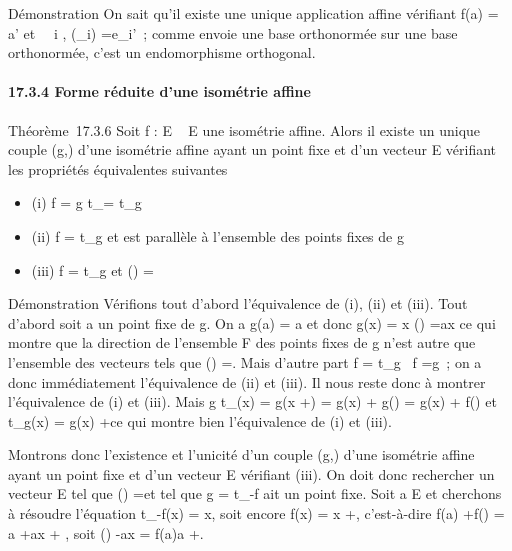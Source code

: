 \documentclass[]{article}
\begin{document}
Démonstration On sait qu'il existe une unique application affine
vérifiant f(a) = a' et \forall~~i \in [1,n],
\vecf(\vece_i)
=\vec e_i'~; comme \vecf
envoie une base orthonormée sur une base orthonormée, c'est un
endomorphisme orthogonal.

\paragraph{17.3.4 Forme réduite d'une isométrie affine}

Théorème~17.3.6 Soit f : E \rightarrow~ E une isométrie affine. Alors il existe un
unique couple (g,\overrightarrow\xi) d'une isométrie
affine ayant un point fixe et d'un vecteur
\overrightarrow\xi \in\overrightarrow
E vérifiant les propriétés équivalentes suivantes

\begin{itemize}
\itemsep1pt\parskip0pt
\item
  (i) f = g \cdot t_\overrightarrow\xi =
  t_\overrightarrow\xi \cdot g
\item
  (ii) f = t_\overrightarrow\xi \cdot g et
  \overrightarrow\xi est parallèle à l'ensemble des
  points fixes de g
\item
  (iii) f = t_\overrightarrow\xi \cdot g et
  \vecf(\overrightarrow\xi)
  =\overrightarrow \xi
\end{itemize}

Démonstration Vérifions tout d'abord l'équivalence de (i), (ii) et
(iii). Tout d'abord soit a un point fixe de g. On a g(a) = a et donc
g(x) = x \Leftrightarrow
\vecg(\overrightarrowax)
=\overrightarrow ax ce qui montre que la direction
\overrightarrowF de l'ensemble F des points fixes de
g n'est autre que l'ensemble des vecteurs
\overrightarrow\xi tels que
\vecg(\overrightarrow\xi)
=\overrightarrow \xi. Mais d'autre part f =
t_\overrightarrow\xi \cdot g
\rigtharrow~\vec f =\vec g~; on a donc
immédiatement l'équivalence de (ii) et (iii). Il nous reste donc à
montrer l'équivalence de (i) et (iii). Mais g \cdot
t_\overrightarrow\xi(x) = g(x
+\overrightarrow \xi) = g(x) +\vec
g(\overrightarrow\xi) = g(x) +\vec
f(\overrightarrow\xi) et
t_\overrightarrow\xi \cdot g(x) = g(x)
+\overrightarrow \xi ce qui montre bien l'équivalence
de (i) et (iii).

Montrons donc l'existence et l'unicité d'un couple
(g,\overrightarrow\xi) d'une isométrie affine ayant un
point fixe et d'un vecteur \overrightarrow\xi
\in\overrightarrow E vérifiant (iii). On doit donc
rechercher un vecteur \overrightarrow\xi
\in\overrightarrow E tel que
\vecf(\overrightarrow\xi)
=\overrightarrow \xi et tel que g =
t_-\overrightarrow\xi \cdot f ait un point fixe.
Soit a \in E et cherchons à résoudre l'équation
t_-\overrightarrow\xi \cdot f(x) = x, soit encore
f(x) = x +\overrightarrow \xi, c'est-à-dire f(a)
+\vec f(\overrightarrowax) = a
+\overrightarrow ax +\overrightarrow
\xi, soit \vecf(\overrightarrowax)
-\overrightarrow ax =\overrightarrow
f(a)a +\overrightarrow \xi.
\end{document}
